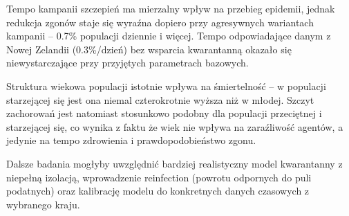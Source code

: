 \documentclass[polish]{projectreport}
\begin{document}
Tempo kampanii szczepień ma mierzalny wpływ na przebieg epidemii,
jednak redukcja zgonów staje się wyraźna dopiero przy agresywnych
wariantach kampanii -- 0.7\% populacji dziennie i więcej. Tempo
odpowiadające danym z Nowej Zelandii (0.3\%/dzień) bez wsparcia
kwarantanną okazało się niewystarczające przy przyjętych parametrach
bazowych.

Struktura wiekowa populacji istotnie wpływa na śmiertelność --
w populacji starzejącej się jest ona niemal czterokrotnie wyższa
niż w młodej. Szczyt zachorowań jest natomiast stosunkowo podobny
dla populacji przeciętnej i starzejącej się, co wynika z faktu
że wiek nie wpływa na zaraźliwość agentów, a jedynie na tempo
zdrowienia i prawdopodobieństwo zgonu.

Dalsze badania mogłyby uwzględnić bardziej realistyczny model
kwarantanny z niepełną izolacją, wprowadzenie reinfection (powrotu
odpornych do puli podatnych) oraz kalibrację modelu do konkretnych
danych czasowych z wybranego kraju.
\printbibliography

\end{document}
